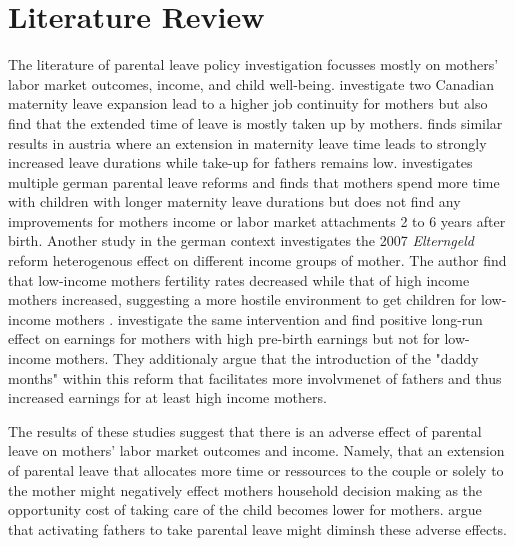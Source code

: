\section{Literature Review}

The literature of parental leave policy investigation focusses mostly on mothers' labor market outcomes, income, and child well-being.
\citet{baker2008does} investigate two Canadian maternity leave expansion lead to a higher job continuity for mothers but also find that the
extended time of leave is mostly taken up by mothers.
\citet{laliveParentalLeaveMothers2014} finds similar results in austria where an extension in maternity leave time leads to strongly increased leave durations
while take-up for fathers remains low.
 \citet{schonbergExpansionsMaternityLeave2014} investigates multiple german parental leave reforms and finds that mothers spend more time with children with longer
maternity leave durations but does not find any improvements for mothers income or labor market attachments 2 to 6 years after birth.
Another study in the german context investigates the 2007 \textit{Elterngeld} reform heterogenous effect on different income groups of mother. The author find that
low-income mothers fertility rates decreased while that of high income mothers increased, suggesting a more hostile environment to get children for low-income mothers
\citep{cygan-rehmParentalLeaveBenefit2016}.
\citet*{frodermannParentalLeavePolicy2023} investigate the same intervention and find positive long-run effect on earnings for mothers with high pre-birth earnings but not for low-income mothers.
They additionaly argue that the introduction of the "daddy months" within this reform that facilitates more involvmenet of fathers and thus increased earnings for at least
high income mothers.


The results of these studies suggest that there is an adverse effect of parental leave on mothers' labor market outcomes and income. Namely,
that an extension of parental leave that allocates more time or ressources to the couple or solely to the mother might negatively effect mothers
household decision making as the opportunity cost of taking care of the child becomes lower for mothers.
\citet{canaanMaternityLeavePaternity2022} argue that activating fathers to take parental leave might diminsh these adverse effects.


